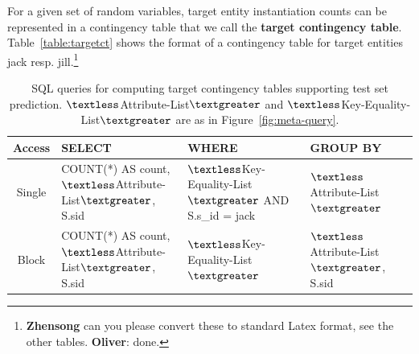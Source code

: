 For a given set of random variables, target entity instantiation counts can be represented in a contingency table that we call the \textbf{target contingency table}. Table~\ref{table:targetct} shows the format of a contingency table for target entities jack resp. jill.\footnote{\textbf{Zhensong} can you please convert these to standard Latex format, see the other tables. \textbf{Oliver}: done.}

\begin{table}[t]
\caption{SQL queries for computing target contingency tables supporting test set prediction.  $\textless$Attribute-List$\textgreater$ and  $\textless$Key-Equality-List$\textgreater$ are as in Figure~\ref{fig:meta-query}.}
\begin{center}
\begin{tabular}{|c|p{6cm}|p{5cm}|p{4cm}|}
\hline
Access &SELECT&WHERE&GROUP BY\\\hline
Single &COUNT(*) AS count, $\textless$Attribute-List$\textgreater$, S.sid& $\textless$Key-Equality-List$\textgreater$ AND S.s\_id = jack&  $\textless$Attribute-List$\textgreater$\\
\hline
Block & COUNT(*) AS count,  $\textless$Attribute-List$\textgreater$, S.sid& $\textless$Key-Equality-List$\textgreater$ &  $\textless$Attribute-List$\textgreater$, S.sid\\\hline
\end{tabular}
\end{center}
\label{table:target-query}
\end{table}%



